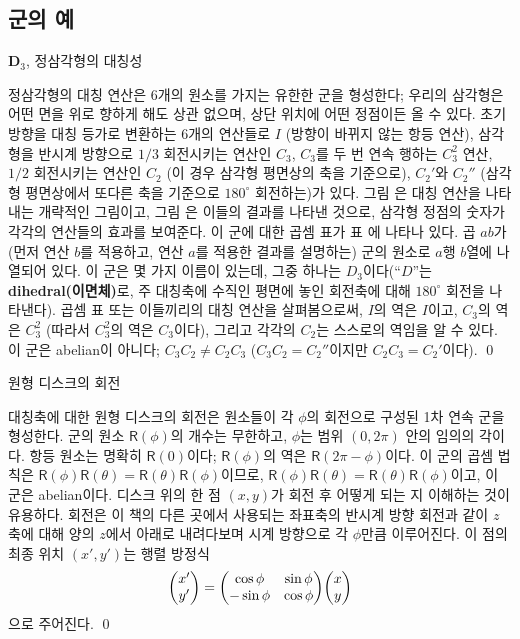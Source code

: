 \subsection{군의 예}
\begin{example}
	$\bm{D}_3$, \textsf{정삼각형의 대칭성}
	
	정삼각형의 대칭 연산은 6개의 원소를 가지는 유한한 군을 형성한다; 우리의 삼각형은 어떤 면을 위로 향하게 해도 상관 없으며, 상단 위치에 어떤 정점이든 올 수 있다. 초기 방향을 대칭 등가로 변환하는 6개의 연산들로 $I$ (방향이 바뀌지 않는 항등 연산), 삼각형을 반시계 방향으로 $1/3$ 회전시키는 연산인 $C_3$, $C_3$를 두 번 연속 행하는 $C_3^2$ 연산, $1/2$ 회전시키는 연산인 $C_2$ (이 경우 삼각형 평면상의 축을 기준으로), $C_2'$와 $C_2''$ (삼각형 평면상에서 또다른 축을 기준으로 $180^\circ$ 회전하는)가 있다. 그림 은 대칭 연산을 나타내는 개략적인 그림이고, 그림 은 이들의 결과를 나타낸 것으로, 삼각형 정점의 숫자가 각각의 연산들의 효과를 보여준다. 이 군에 대한 곱셈 표가 표 에 나타나 있다. 곱 $ab$가 (먼저 연산 $b$를 적용하고, 연산 $a$를 적용한 결과를 설명하는) 군의 원소로 $a$행 $b$열에 나열되어 있다. 이 군은 몇 가지 이름이 있는데, 그중 하나는 $D_3$이다(``$D$''는 \textbf{dihedral(이면체)}로, 주 대칭축에 수직인 평면에 놓인 회전축에 대해 $180^\circ$ 회전을 나타낸다). 곱셈 표 또는 이들끼리의 대칭 연산을 살펴봄으로써, $I$의 역은 $I$이고, $C_3$의 역은 $C_3^2$ (따라서 $C_3^2$의 역은 $C_3$이다), 그리고 각각의 $C_2$는 스스로의 역임을 알 수 있다. 이 군은 abelian이 아니다; $C_3C_2 \neq C_2C_3$ ($C_3C_2 = C_2''$이지만 $C_2C_3=C_2'$이다). \qed
\end{example}

\begin{example}
	\textsf{원형 디스크의 회전}
	
	대칭축에 대한 원형 디스크의 회전은 원소들이 각 $\phi$의 회전으로 구성된 1차 연속 군을 형성한다. 군의 원소 $\mathsf{R}(\phi)$의 개수는 무한하고, $\phi$는 범위 $(0, 2\pi)$ 안의 임의의 각이다. 항등 원소는 명확히 $\mathsf{R}(0)$이다; $\mathsf{R}(\phi)$의 역은 $\mathsf{R}(2\pi - \phi)$이다. 이 군의 곱셈 법칙은 $\mathsf{R}(\phi)\mathsf{R}(\theta) = \mathsf{R}(\theta)\mathsf{R}(\phi)$이므로, $\mathsf{R}(\phi)\mathsf{R}(\theta) = \mathsf{R}(\theta)\mathsf{R}(\phi)$이고, 이 군은 abelian이다. 디스크 위의 한 점 $(x, y)$가 회전 후 어떻게 되는 지 이해하는 것이 유용하다. 회전은 이 책의 다른 곳에서 사용되는 좌표축의 반시계 방향 회전과 같이 $z$축에 대해 양의 $z$에서 아래로 내려다보며 시계 방향으로 각 $\phi$만큼 이루어진다. 이 점의 최종 위치 $(x',y')$는 행렬 방정식
	\begin{equation}
		\mqty(x' \\ y') = \mqty( \cos \phi & \sin \phi \\ -\sin \phi & \cos \phi ) \mqty(x \\ y)
	\end{equation}
	으로 주어진다. \qed
\end{example}

